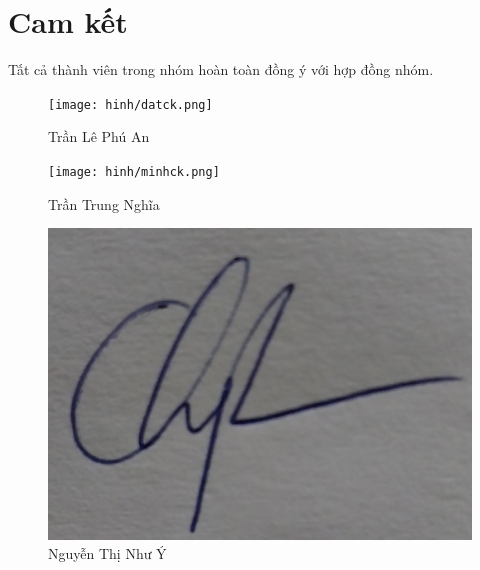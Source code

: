 \documentclass[../main-report.tex]{subfiles}
\begin{document}
\section{Cam kết}
Tất cả thành viên trong nhóm hoàn toàn đồng ý với hợp đồng nhóm.
\begin{figure}[ht]
    \centering
    \texttt{[image: hinh/datck.png]}
    \caption{Trần Lê Phú An}
\end{figure}
\begin{figure}[ht]
    \centering
    \texttt{[image: hinh/minhck.png]}
    \caption{Trần Trung Nghĩa}
\end{figure}
\begin{figure}[ht]
    \centering
    \includegraphics[scale=0.1]{chapters/hinh/NhuY.jpg}
    \caption{Nguyễn Thị Như Ý}
\end{figure}
\end{document}
